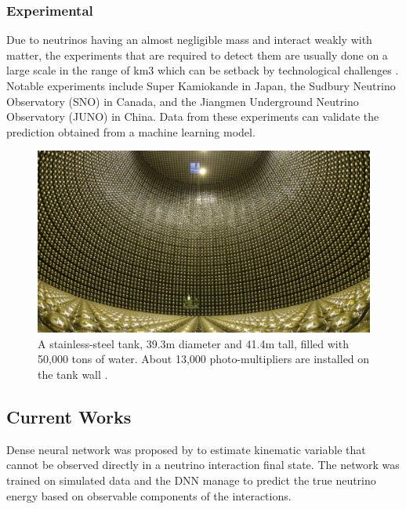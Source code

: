 \subsubsection{Experimental}
Due to neutrinos having an almost negligible mass and interact weakly with matter, the experiments that are required to detect them are usually done on a large scale in the range of km3 which can be setback by technological challenges . Notable experiments include Super Kamiokande in Japan, the Sudbury Neutrino Observatory (SNO) in Canada, and the Jiangmen Underground Neutrino Observatory (JUNO) in China. Data from these experiments can validate the prediction obtained from a machine learning model.
\begin{figure}[H]
	\centering
	\includegraphics[width=\textwidth]{assets/pictKam.jpg}
	\caption{A stainless-steel tank, 39.3m diameter and 41.4m tall, filled with 50,000 tons of water. About 13,000 photo-multipliers are installed on the tank wall \protect\cite{SuperK}.
	}
	\label{fig:SKMK}
\end{figure}

\subsection{Current Works}
Dense neural network was proposed by  to estimate kinematic variable that cannot be observed directly in a neutrino interaction final state. The network was trained on simulated data and the DNN manage to predict the true neutrino energy based on observable components of the interactions. 

